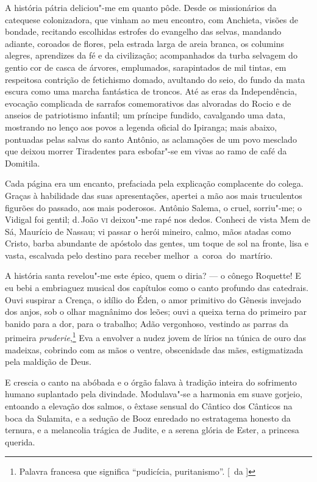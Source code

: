 A história pátria deliciou"-me em quanto pôde. Desde os missionários da 
catequese colonizadora, que vinham ao meu encontro, com Anchieta, visões de
bondade, recitando escolhidas estrofes do evangelho das selvas,
mandando adiante, coroados de flores, pela estrada larga de areia
branca, os columins alegres, aprendizes da fé e da civilização;
acompanhados da turba selvagem do gentio cor de casca de árvores,
emplumados, sarapintados de mil tintas, em respeitosa contrição de
fetichismo domado, avultando do seio, do fundo da mata escura como uma
marcha fantástica de troncos. Até as eras da Independência, evocação
complicada de sarrafos comemorativos das alvoradas do Rocio e de
anseios de patriotismo infantil; um príncipe fundido, cavalgando uma
data, mostrando no lenço aos povos a legenda oficial do Ipiranga; mais
abaixo, pontuadas pelas salvas do santo Antônio, as aclamações de um
povo mesclado que deixou morrer Tiradentes para esbofar"-se em vivas
ao ramo de café da Domitila. 

Cada página era um encanto, prefaciada pela explicação
complacente do colega. Graças à habilidade das suas apresentações,
apertei a mão aos mais truculentos figurões do passado, aos mais
poderosos. Antônio Salema, o cruel, sorriu"-me; o Vidigal foi gentil;
d.\,João \textsc{vi} deixou"-me rapé nos dedos. Conheci de vista Mem de Sá,
Maurício de Nassau; vi passar o herói mineiro, calmo, mãos atadas como
Cristo, barba abundante de apóstolo das gentes, um toque de sol na
fronte, lisa e vasta, escalvada pelo destino para receber \mbox{melhor a
coroa do martírio.} 

A história santa revelou"-me este épico, quem o
diria? --- o cônego Roquette! E eu bebi a embriaguez musical dos
capítulos como o canto profundo das catedrais. Ouvi suspirar a Crença,
o idílio do Éden, o amor primitivo do Gênesis invejado dos anjos, sob o
olhar magnânimo dos leões; ouvi a queixa terna do primeiro par banido
para a dor, para o trabalho; Adão vergonhoso, vestindo as parras da
primeira \textit{pruderie},\footnote{ Palavra francesa que significa ``pudicícia, puritanismo''. [~da ]} Eva a envolver a nudez jovem de lírios na túnica de
ouro das madeixas, cobrindo com as mãos o ventre, obscenidade das mães,
estigmatizada pela maldição de Deus. 


E crescia o canto na abóbada e o
órgão falava à tradição inteira do sofrimento humano suplantado pela
divindade. Modulava"-se a harmonia em suave gorjeio, entoando a
elevação dos salmos, o êxtase sensual do Cântico dos Cânticos na boca
da Sulamita, e a sedução de Booz enredado no estratagema honesto da
ternura, e a melancolia trágica de Judite, e a serena glória de Ester,
a princesa querida. 

